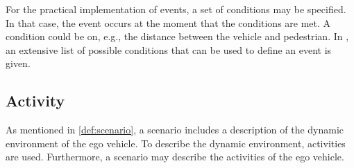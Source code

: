 For the practical implementation of events, a set of conditions may be specified. In that case, the event occurs at the moment that the conditions are met. A condition could be on, e.g., the distance between the vehicle and pedestrian. In \autocite{openscenario}, an extensive list of possible conditions that can be used to define an event is given.







\subsection{Activity}
\label{sec:activity}

As mentioned in \cref{def:scenario}, a scenario  includes  a description of the dynamic environment of the ego vehicle. To describe the dynamic environment, activities are used. Furthermore, a scenario may describe the activities of the ego vehicle. 

